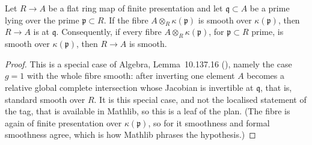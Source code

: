 \begin{lemma}
\label{lem:pc-smooth-local-criterion}
Let $R\to A$ be a flat ring map of finite presentation and let $\mathfrak q\subset A$ be a
prime lying over the prime $\mathfrak p\subset R$.  If the fibre
$A\otimes_R\kappa(\mathfrak p)$ is smooth over $\kappa(\mathfrak p)$, then $R\to A$ is
 at $\mathfrak q$.  Consequently, if every fibre
$A\otimes_R\kappa(\mathfrak p)$, for $\mathfrak p\subset R$ prime, is smooth over
$\kappa(\mathfrak p)$, then $R\to A$ is smooth.
\mathlibok\ 
\end{lemma}
\begin{proof}
This is a special case of Algebra, Lemma~10.137.16 (), namely the case
$g=1$ with the whole fibre smooth: after inverting one element $A$ becomes a relative global
complete intersection whose Jacobian is invertible at $\mathfrak q$, that is, standard smooth
over $R$.  It is this special case, and not the localised statement of the tag, that is
available in Mathlib, so this is a leaf of the plan.  (The fibre is again of finite
presentation over $\kappa(\mathfrak p)$, so for it smoothness and formal smoothness agree,
which is how Mathlib phrases the hypothesis.)
\end{proof}

